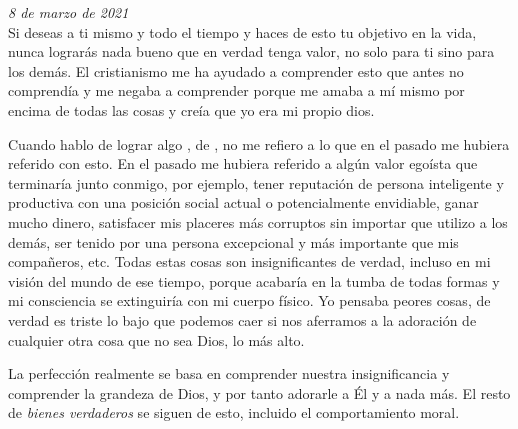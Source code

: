 \documentclass[12pt]{article}
\begin{document}
	\textit{8 de marzo de 2021}\\

	Si deseas  a ti mismo y 
	todo el tiempo y haces de esto tu objetivo en la vida, nunca lograrás
	nada bueno que en verdad tenga valor, no solo para ti sino para los
	demás. El cristianismo me ha ayudado a comprender esto que antes no
	comprendía y me negaba a comprender porque me amaba a mí mismo por
	encima de todas las cosas y creía que yo era mi propio dios.

	Cuando hablo de lograr algo , de , no me refiero a lo que en el pasado me hubiera referido con
	esto. En el pasado me hubiera referido a algún valor egoísta que
	terminaría junto conmigo, por ejemplo, tener reputación de persona
	inteligente y productiva con una posición social actual o potencialmente
	envidiable, ganar mucho dinero, satisfacer mis placeres más corruptos
	sin importar que utilizo a los demás, ser tenido por una persona
	excepcional y más importante que mis compañeros, etc. Todas estas cosas
	son insignificantes de verdad, incluso en mi visión del mundo de ese
	tiempo, porque acabaría en la tumba de todas formas y mi consciencia se
	extinguiría con mi cuerpo físico. Yo pensaba peores cosas, de verdad es
	triste lo bajo que podemos caer si nos aferramos a la adoración de
	cualquier otra cosa que no sea Dios, lo más alto.

	La perfección realmente se basa en comprender nuestra
	insignificancia y comprender la grandeza de Dios, y por tanto adorarle a
	Él y a nada más. El resto de \textit{bienes verdaderos} se siguen de
	esto, incluido el comportamiento moral.
\end{document}
